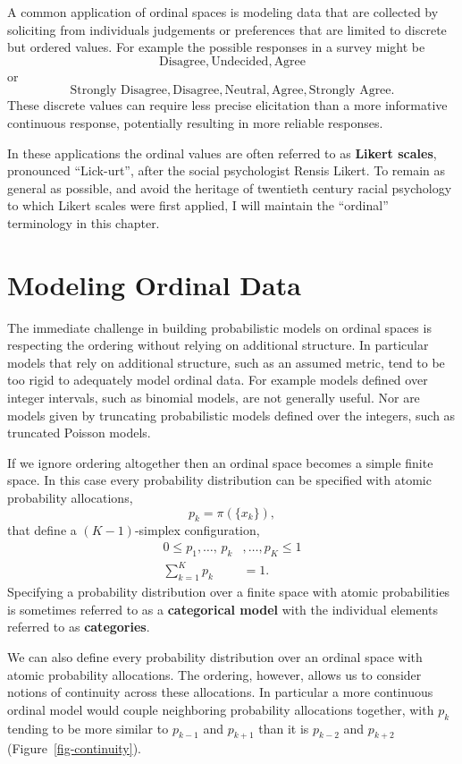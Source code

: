 \documentclass[
  letterpaper,
  DIV=11,
  numbers=noendperiod]{scrartcl}
\begin{document}
A common application of ordinal spaces is modeling data that are
collected by soliciting from individuals judgements or preferences that
are limited to discrete but ordered values. For example the possible
responses in a survey might be \[
\text{Disagree}, \text{Undecided}, \text{Agree}
\] or \[
\text{Strongly Disagree}, \text{Disagree},
\text{Neutral},
\text{Agree}, \text{Strongly Agree}.
\] These discrete values can require less precise elicitation than a
more informative continuous response, potentially resulting in more
reliable responses.

In these applications the ordinal values are often referred to as
\textbf{Likert scales}, pronounced ``Lick-urt'', after the social
psychologist Rensis Likert. To remain as general as possible, and avoid
the heritage of twentieth century racial psychology to which Likert
scales were first applied, I will maintain the ``ordinal'' terminology
in this chapter.

\section{Modeling Ordinal Data}\label{modeling-ordinal-data}

The immediate challenge in building probabilistic models on ordinal
spaces is respecting the ordering without relying on additional
structure. In particular models that rely on additional structure, such
as an assumed metric, tend to be too rigid to adequately model ordinal
data. For example models defined over integer intervals, such as
binomial models, are not generally useful. Nor are models given by
truncating probabilistic models defined over the integers, such as
truncated Poisson models.

If we ignore ordering altogether then an ordinal space becomes a simple
finite space. In this case every probability distribution can be
specified with atomic probability allocations, \[
p_{k} = \pi( \{ x_{k} \} ),
\] that define a \((K - 1)\)-simplex configuration, \begin{align*}
0 \le p_{1}, \ldots, \, p_{k}&, \ldots, p_{K} \le 1
\\
\sum_{k = 1}^{K} p_{k}& = 1.
\end{align*} Specifying a probability distribution over a finite space
with atomic probabilities is sometimes referred to as a
\textbf{categorical model} with the individual elements referred to as
\textbf{categories}.

We can also define every probability distribution over an ordinal space
with atomic probability allocations. The ordering, however, allows us to
consider notions of continuity across these allocations. In particular a
more continuous ordinal model would couple neighboring probability
allocations together, with \(p_{k}\) tending to be more similar to
\(p_{k - 1}\) and \(p_{k + 1}\) than it is \(p_{k - 2}\) and
\(p_{k + 2}\) (Figure~\ref{fig-continuity}).
\end{document}
